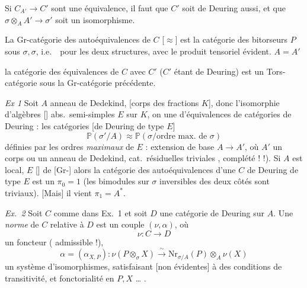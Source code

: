 \documentclass[11pt,a4paper]{article}
\begin{document}
Si $C_{A'} \to C'$ sont une équivalence, il faut que $C'$ soit de Deuring
aussi, et que $\sigma \otimes_{A} A' \to \sigma'$ soit un isomorphisme.

La Gr-catégorie des autoéquivalences de $C$ [$\approx$] est la catégorie
des bitorseurs $P$ sous $\sigma, \sigma$, i.e.\ \ pour les deux structures, avec le produit tensoriel évident.
 $A = A'$

la catégorie des équivalences de $C$ avec $C'$ ($C'$ étant de Deuring) est
un Tors-catégorie sous la Gr-catégorie précédente.

\emph{Ex 1} Soit $A$ anneau de Dedekind, [corps des fractions $K$],
 donc l'isomorphie d'algèbres
[] abs.\ semi-simples $E$ sur $K$, on \ill{} une
\ill{} d'équivalences de catégories de Deuring : les catégories
[de Deuring de type $E$]
\[
  \mathbb{P}(\sigma'/A) \approx \mathbb{P}(\sigma/\text{ordre max.\ de }
  \sigma)
\]
définies par les ordres \emph{maximaux} de $E$ : \struck{\ill{}}
\ill{} extension de base $A \to A'$, où $A'$ un corps ou un anneau de
Dedekind, cat.\ résiduelles triviales \ill{}, complété \ill{} ! !). Si
$A$ est local, $E$  \ill{} [\ill{}] de
\struck{\ill{}} [$\mathrm{Gr}$-] alors la catégorie \struck{\ill{}} des
autoéquivalences d'une $C$ de Deuring de type $E$ est un $\pi_{0} = 1$
(les bimodules sur $\sigma$ inversibles des deux côtés sont triviaux).
 [Mais] il vient $\pi_{1} = A^{*}$.

\emph{Ex.\ 2} Soit $C$ comme dans Ex.\ 1 et soit $D$ une catégorie de
Deuring \ill{} sur $A$. Une \emph{norme} de $C$ relative à $D$ est un couple
$(\nu, \alpha)$, où
\[
  \nu : C \longrightarrow D
\]
un foncteur (\ill{} \ill{} admissible !),
\[
  \alpha = (\alpha_{X, P}) : \nu(P \otimes_{\sigma} X)
  \xrightarrow{\ \sim\ } \mathrm{Nr}_{\sigma/A}(P) \otimes_{A} \nu(X)
\]
un système d'isomorphismes, satisfaisant [non évidentes] à des conditions de
transitivité, et fonctorialité en $P, X$ … .
\end{document}
